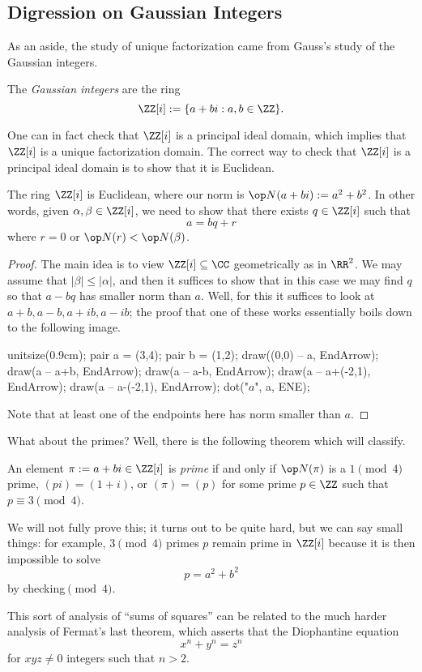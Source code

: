 \subsection{Digression on Gaussian Integers}
As an aside, the study of unique factorization came from Gauss's study of the Gaussian integers.
\begin{definition}
	The \textit{Gaussian integers} are the ring
	\[\ZZ[i]:=\{a+bi:a,b\in\ZZ\}.\]
\end{definition}
One can in fact check that $\ZZ[i]$ is a principal ideal domain, which implies that $\ZZ[i]$ is a unique factorization domain. The correct way to check that $\ZZ[i]$ is a principal ideal domain is to show that it is Euclidean.
\begin{lemma}
	The ring $\ZZ[i]$ is Euclidean, where our norm is $\op N(a+bi):=a^2+b^2$. In other words, given $\alpha,\beta\in\ZZ[i]$, we need to show that there exists $q\in\ZZ[i]$ such that
	\[a=bq+r\]
	where $r=0$ or $\op N(r)<\op N(\beta)$.
\end{lemma}
\begin{proof}
	The main idea is to view $\ZZ[i]\subseteq\CC$ geometrically as in $\RR^2$. We may assume that $|\beta|\le|\alpha|$, and then it suffices to show that in this case we may find $q$ so that $a-bq$ has smaller norm than $a$. Well, for this it suffices to look at $a+b,a-b,a+ib,a-ib$; the proof that one of these works essentially boils down to the following image.
	\begin{center}
		\begin{asy}
			unitsize(0.9cm);
			pair a = (3,4);
			pair b = (1,2);
			draw((0,0) -- a, EndArrow);
			draw(a -- a+b, EndArrow);
			draw(a -- a-b, EndArrow);
			draw(a -- a+(-2,1), EndArrow);
			draw(a -- a-(-2,1), EndArrow);
			dot("$a$", a, ENE);
		\end{asy}
	\end{center}
	Note that at least one of the endpoints here has norm smaller than $a$.
\end{proof}
What about the primes? Well, there is the following theorem which will classify.
\begin{theorem}
	An element $\pi:=a+bi\in\ZZ[i]$ is \textit{prime} if and only if $\op N(\pi)$ is a $1\pmod4$ prime, $(pi)=(1+i)$, or $(\pi)=(p)$ for some prime $p\in\ZZ$ such that $p\equiv3\pmod4$.
\end{theorem}
We will not fully prove this; it turns out to be quite hard, but we can say small things: for example, $3\pmod4$ primes $p$ remain prime in $\ZZ[i]$ because it is then impossible to solve
\[p=a^2+b^2\]
by checking$\pmod4$.
\begin{remark}
	This sort of analysis of ``sums of squares'' can be related to the much harder analysis of Fermat's last theorem, which asserts that the Diophantine equation
	\[x^n+y^n=z^n\]
	for $xyz\ne0$ integers such that $n>2$.
\end{remark}

